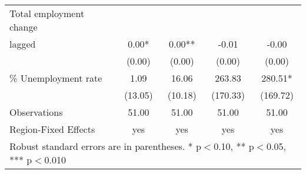 \begin{table}[htbp]
\begin{tabular}{l*{4}{c}}
Total employment change \\ lagged&        0.00*  &        0.00** &       -0.01   &       -0.00   \\
                    &      (0.00)   &      (0.00)   &      (0.00)   &      (0.00)   \\
\% Unemployment rate&        1.09   &       16.06   &      263.83   &      280.51*  \\
                    &     (13.05)   &     (10.18)   &    (170.33)   &    (169.72)   \\
\hline
Observations        &       51.00   &       51.00   &       51.00   &       51.00   \\
Region-Fixed Effects&         yes   &         yes   &         yes   &         yes   \\
\hline\hline
\multicolumn{5}{l}{\footnotesize Robust standard errors are in parentheses. * p$<$0.10, ** p$<$0.05, *** p$<$0.010}\\
\end{tabular}
\end{table}
